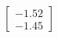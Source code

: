 \documentclass[preview]{standalone}
\begin{document}
\begin{align*}
\begin{bmatrix} -1.52 \\ -1.45 \end{bmatrix}
\end{align*}
\end{document}

